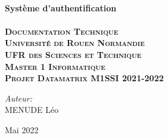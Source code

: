 \begin{titlepage}

\center %



\HRule \\[0.4cm]
{ \huge \bfseries Système d'authentification}\\[0.4cm] %
\HRule \\[1.5cm]

\textsc{\huge \textbf{Documentation Technique}}\\[1.5cm]

\textsc{\Large \textbf{Université de Rouen Normandie \\[0.07cm] UFR des Sciences et Technique \\[1,5cm] Master 1 Informatique\\[0.5cm] Projet Datamatrix M1SSI 2021-2022}}


\vspace{3cm}

\begin{center} \large
\Large \emph{Auteur:}\\[0.1cm]
\Large MENUDE Léo
\end{center}



{\large Mai 2022}\\[2cm] %


\end{titlepage}
